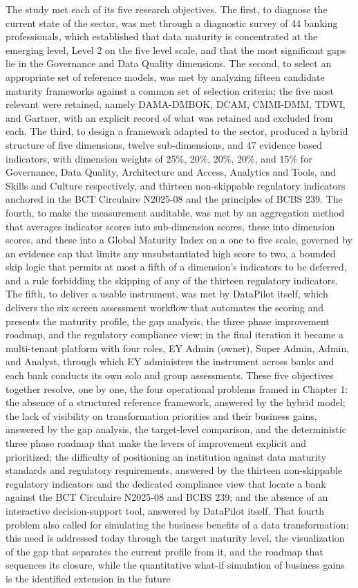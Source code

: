 The study met each of its five research objectives. The first, to diagnose the current state of the sector, was met through a diagnostic survey of 44 banking professionals, which established that data maturity is concentrated at the emerging level, Level 2 on the five level scale, and that the most significant gaps lie in the Governance and Data Quality dimensions. The second, to select an appropriate set of reference models, was met by analyzing fifteen candidate maturity frameworks against a common set of selection criteria; the five most relevant were retained, namely DAMA-DMBOK, DCAM, CMMI-DMM, TDWI, and Gartner, with an explicit record of what was retained and excluded from each. The third, to design a framework adapted to the sector, produced a hybrid structure of five dimensions, twelve sub-dimensions, and 47 evidence based indicators, with dimension weights of 25\%, 20\%, 20\%, 20\%, and 15\% for Governance, Data Quality, Architecture and Access, Analytics and Tools, and Skills and Culture respectively, and thirteen non-skippable regulatory indicators anchored in the BCT Circulaire N\textdegree{}2025-08 and the principles of BCBS 239. The fourth, to make the measurement auditable, was met by an aggregation method that averages indicator scores into sub-dimension scores, these into dimension scores, and these into a Global Maturity Index on a one to five scale, governed by an evidence cap that limits any unsubstantiated high score to two, a bounded skip logic that permits at most a fifth of a dimension's indicators to be deferred, and a rule forbidding the skipping of any of the thirteen regulatory indicators. The fifth, to deliver a usable instrument, was met by DataPilot itself, which delivers the six screen assessment workflow that automates the scoring and presents the maturity profile, the gap analysis, the three phase improvement roadmap, and the regulatory compliance view; in the final iteration it became a multi-tenant platform with four roles, EY Admin (owner), Super Admin, Admin, and Analyst, through which EY administers the instrument across banks and each bank conducts its own solo and group assessments. These five objectives together resolve, one by one, the four operational problems framed in Chapter 1: the absence of a structured reference framework, answered by the hybrid model; the lack of visibility on transformation priorities and their business gains, answered by the gap analysis, the target-level comparison, and the deterministic three phase roadmap that make the levers of improvement explicit and prioritized; the difficulty of positioning an institution against data maturity standards and regulatory requirements, answered by the thirteen non-skippable regulatory indicators and the dedicated compliance view that locate a bank against the BCT Circulaire N\textdegree{}2025-08 and BCBS 239; and the absence of an interactive decision-support tool, answered by DataPilot itself. That fourth problem also called for simulating the business benefits of a data transformation; this need is addressed today through the target maturity level, the visualization of the gap that separates the current profile from it, and the roadmap that sequences its closure, while the quantitative what-if simulation of business gains is the identified extension in the future 